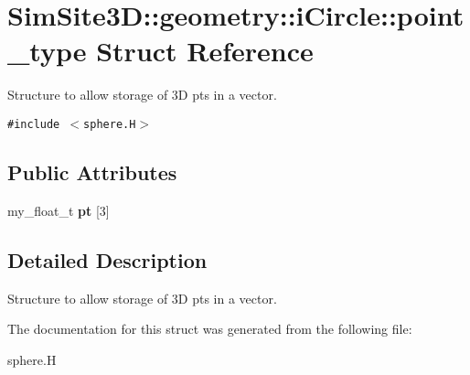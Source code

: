 \section{SimSite3D::geometry::i\-Circle::point\_\-type Struct Reference}
\label{structSimSite3D_1_1geometry_1_1iCircle_1_1point__type}
Structure to allow storage of 3D pts in a vector.  


{\tt \#include $<$sphere.H$>$}

\subsection*{Public Attributes}
\begin{CompactItemize}
\item 
my\_\-float\_\-t \textbf{pt} [3]\label{structSimSite3D_1_1geometry_1_1iCircle_1_1point__type_b2fba8f10a57aa81097fe33f7026628f}

\end{CompactItemize}


\subsection{Detailed Description}
Structure to allow storage of 3D pts in a vector. 



The documentation for this struct was generated from the following file:\begin{CompactItemize}
\item 
sphere.H\end{CompactItemize}
